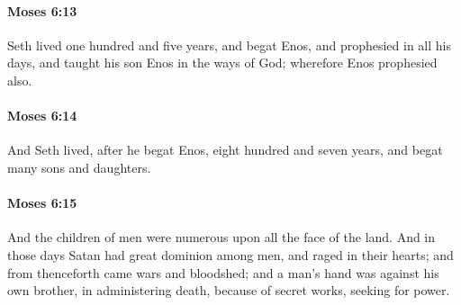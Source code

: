 		\paragraph{Moses 6:13} %
			\label{MOSES-6-13}

			Seth lived one hundred and five years, and begat Enos, and prophesied in all his days, and taught his son Enos in the ways of God; wherefore Enos prophesied also.


		\paragraph{Moses 6:14} %
			\label{MOSES-6-14}

			And Seth lived, after he begat Enos, eight hundred and seven years, and begat many sons and daughters.


		\paragraph{Moses 6:15} %
			\label{MOSES-6-15}

			And the children of men were numerous upon all the face of the land. And in those days Satan had great dominion among men, and raged in their hearts; and from thenceforth came wars and bloodshed; and a man's hand was against his own brother, in administering death, because of secret works, seeking for power.



